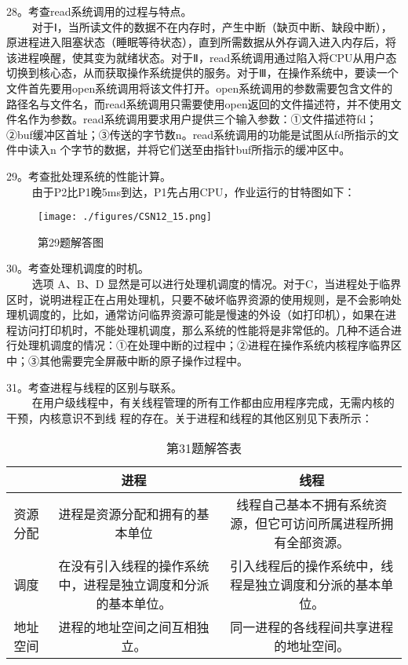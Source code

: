 28。考查read系统调用的过程与特点。\\
$\qquad$ 对于Ⅰ，当所读文件的数据不在内存时，产生中断（缺页中断、缺段中断），原进程进入阻塞状态（睡眠等待状态），直到所需数据从外存调入进入内存后，将该进程唤醒，使其变为就绪状态。对于Ⅱ，read系统调用通过陷入将CPU从用户态切换到核心态，从而获取操作系统提供的服务。对于Ⅲ，在操作系统中，要读一个文件首先要用open系统调用将该文件打开。open系统调用的参数需要包含文件的路径名与文件名，而read系统调用只需要使用open返回的文件描述符，并不使用文件名作为参数。read系统调用要求用户提供三个输入参数：①文件描述符fd；②buf缓冲区首址；③传送的字节数n。read系统调用的功能是试图从fd所指示的文件中读入n 个字节的数据，并将它们送至由指针buf所指示的缓冲区中。

29。考查批处理系统的性能计算。\\
$\qquad$ 由于P2比P1晚5ms到达，P1先占用CPU，作业运行的甘特图如下：
\begin{figure}[ht]
\centering
\texttt{[image: ./figures/CSN12\_15.png]}
\caption{第29题解答图} \label{CSN12_fig15}
\end{figure}

30。考查处理机调度的时机。\\
$\qquad$ 选项 A、B、D 显然是可以进行处理机调度的情况。对于C，当进程处于临界区时，说明进程正在占用处理机，只要不破坏临界资源的使用规则，是不会影响处理机调度的，比如，通常访问临界资源可能是慢速的外设（如打印机），如果在进程访问打印机时，不能处理机调度，那么系统的性能将是非常低的。几种不适合进行处理机调度的情况：①在处理中断的过程中；②进程在操作系统内核程序临界区中；③其他需要完全屏蔽中断的原子操作过程中。

31。考查进程与线程的区别与联系。\\
$\qquad$ 在用户级线程中，有关线程管理的所有工作都由应用程序完成，无需内核的干预，内核意识不到线
程的存在。关于进程和线程的其他区别见下表所示：
\begin{table}[ht]
\centering
\caption{第31题解答表}\label{CSN12_tab7}
\begin{tabular}{|c|c|c|}
\hline
 & 进程 & 线程 \\
\hline
资源分配 & 进程是资源分配和拥有的基本单位 & 线程自己基本不拥有系统资源，但它可访问所属进程所拥有全部资源。 \\
\hline
调度 & 在没有引入线程的操作系统中，进程是独立调度和分派的基本单位。 & 引入线程后的操作系统中，线程是独立调度和分派的基本单位。 \\
\hline
地址空间 & 进程的地址空间之间互相独立。 & 同一进程的各线程间共享进程的地址空间。 \\
\hline
\end{tabular}
\end{table}

